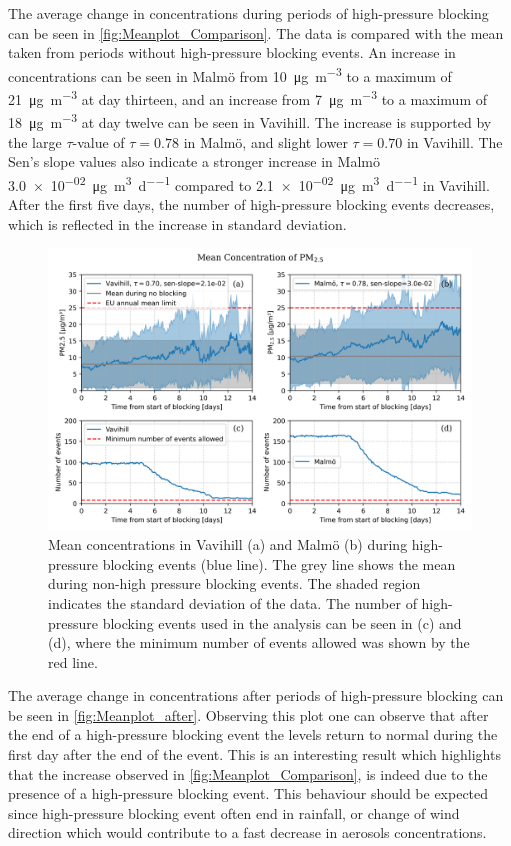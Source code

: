 The average change in \PM concentrations during periods of high-pressure blocking can be seen in \autoref{fig:Meanplot_Comparison}. The data is compared with the \PM mean taken from periods without high-pressure blocking events. An increase in \PM concentrations can be seen in Malmö from \SI{10}{\micro\gram\per\meter\cubed} to a maximum of \SI{21}{\micro\gram\per\meter\cubed} at day thirteen, and an increase from \SI{7}{\micro\gram\per\meter\cubed} to a maximum of \SI{18}{\micro\gram\per\meter\cubed} at day twelve can be seen in Vavihill. The increase is supported by the large $\tau$-value of $\tau=0.78$ in Malmö, and slight lower $\tau=0.70$ in Vavihill. The Sen's slope values also indicate a stronger increase in Malmö \SI{3.0e-02}{\micro\gram\per\meter\cubed\per\day} compared to \SI{2.1e-02}{\micro\gram\per\meter\cubed\per\day} in Vavihill. After the first five days, the number of high-pressure blocking events decreases, which is reflected in the increase in standard deviation. 


\begin{figure}[H]
    \centering
    \includegraphics[width=\textwidth]{Figures/Meanplot.png}
    \caption{Mean \PM concentrations in Vavihill (a) and Malmö (b) during high-pressure blocking events (blue line). The grey line shows the mean \PM during non-high pressure blocking events. The shaded region indicates the standard deviation of the data. The number of high-pressure blocking events used in the analysis can be seen in (c) and (d), where the minimum number of events allowed was shown by the red line. }
    \label{fig:Meanplot_Comparison}
\end{figure}


The average change in \PM concentrations after periods of high-pressure blocking can be seen in \autoref{fig:Meanplot_after}. Observing this plot one can observe that after the end of a high-pressure blocking event the \PM levels return to normal during the first day after the end of the event. This is an interesting result which highlights that the increase observed in \autoref{fig:Meanplot_Comparison}, is indeed due to the presence of a high-pressure blocking event. This behaviour should be expected since high-pressure blocking event often end in rainfall, or change of wind direction which would contribute to a fast decrease in aerosols concentrations. 

